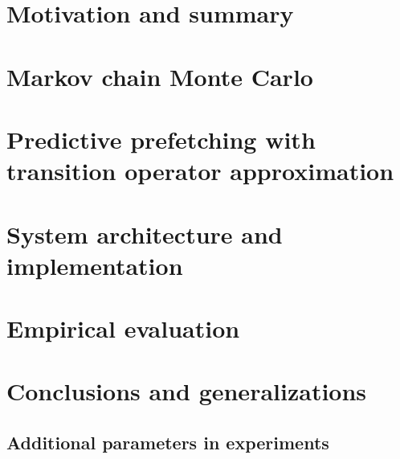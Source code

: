 \documentclass[12pt,oneside]{book}
\begin{document}
\frontmatter



\newpage

\tableofcontents



\mainmatter

\doublespacing

\chapter{Motivation and summary}
\label{sec:introduction}


\chapter{Markov chain Monte Carlo}
\label{sec:mcmc}


\chapter{Predictive prefetching with transition operator approximation}
\label{sec:prefetching}


\chapter{System architecture and implementation}
\label{sec:system}


\chapter{Empirical evaluation}
\label{sec:evaluation}


\chapter{Conclusions and generalizations}
\label{sec:conclusions}





\newpage

\begin{appendices}
\chapter{Additional parameters in experiments}
\label{sec:appendix}

\end{appendices}
\end{document}
